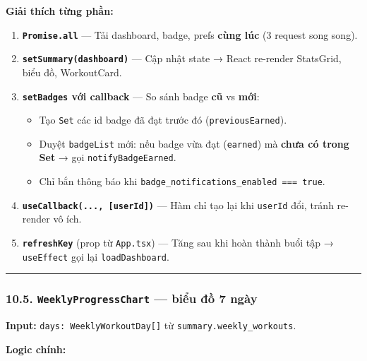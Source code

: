 \documentclass[12pt,a4paper]{article}
\providecommand{\tightlist}{%
  \setlength{\itemsep}{0pt}\setlength{\parskip}{0pt}}
\begin{document}
\textbf{Giải thích từng phần:}

\begin{enumerate}
\def\labelenumi{\arabic{enumi}.}
\tightlist
\item
  \textbf{\texttt{Promise.all}} --- Tải dashboard, badge, prefs
  \textbf{cùng lúc} (3 request song song).
\item
  \textbf{\texttt{setSummary(dashboard)}} --- Cập nhật state → React
  re-render StatsGrid, biểu đồ, WorkoutCard.
\item
  \textbf{\texttt{setBadges} với callback} --- So sánh badge \textbf{cũ}
  vs \textbf{mới}:

  \begin{itemize}
  \tightlist
  \item
    Tạo \texttt{Set} các id badge đã đạt trước đó
    (\texttt{previousEarned}).
  \item
    Duyệt \texttt{badgeList} mới: nếu badge vừa đạt (\texttt{earned}) mà
    \textbf{chưa có trong Set} → gọi \texttt{notifyBadgeEarned}.
  \item
    Chỉ bắn thông báo khi
    \texttt{badge\_notifications\_enabled\ ===\ true}.
  \end{itemize}
\item
  \textbf{\texttt{useCallback(...,\ {[}userId{]})}} --- Hàm chỉ tạo lại
  khi \texttt{userId} đổi, tránh re-render vô ích.
\item
  \textbf{\texttt{refreshKey}} (prop từ \texttt{App.tsx}) --- Tăng sau
  khi hoàn thành buổi tập → \texttt{useEffect} gọi lại
  \texttt{loadDashboard}.
\end{enumerate}

\begin{center}\rule{0.5\linewidth}{0.5pt}\end{center}

\subsubsection{\texorpdfstring{10.5. \texttt{WeeklyProgressChart} ---
biểu đồ 7
ngày}{10.5. WeeklyProgressChart --- biểu đồ 7 ngày}}\label{weeklyprogresschart-biux1ec3u-ux111ux1ed3-7-nguxe0y}

\textbf{Input:} \texttt{days:\ WeeklyWorkoutDay{[}{]}} từ
\texttt{summary.weekly\_workouts}.

\textbf{Logic chính:}
\end{document}

